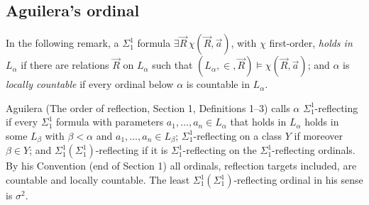 \documentclass[11pt]{article}
\begin{document}
\subsection{Aguilera's ordinal}

In the following remark, a $\Sigma^1_1$ formula $\exists \vec R\, \chi(\vec R, \vec a)$, with $\chi$ first-order,
\emph{holds in} $L_{\alpha}$ if there are relations $\vec R$ on $L_{\alpha}$ such that
$(L_{\alpha}, \in, \vec R) \models \chi(\vec R, \vec a)$; and $\alpha$ is \emph{locally countable} if every ordinal
below $\alpha$ is countable in $L_{\alpha}$.

\begin{statement} Aguilera (The order of reflection, Section 1, Definitions 1--3) calls $\alpha$
$\Sigma^1_1$-reflecting if every $\Sigma^1_1$ formula with parameters $a_1, \dots, a_n \in L_{\alpha}$ that holds in
$L_{\alpha}$ holds in some $L_{\beta}$ with $\beta < \alpha$ and $a_1, \dots, a_n \in L_{\beta}$;
$\Sigma^1_1$-reflecting on a class $Y$ if moreover $\beta \in Y$; and $\Sigma^1_1(\Sigma^1_1)$-reflecting if it is
$\Sigma^1_1$-reflecting on the $\Sigma^1_1$-reflecting ordinals. By his Convention (end of Section 1) all ordinals,
reflection targets included, are countable and locally countable. The least
$\Sigma^1_1(\Sigma^1_1)$-reflecting ordinal in his sense is $\sigma^2$.
\end{statement}
\end{document}
